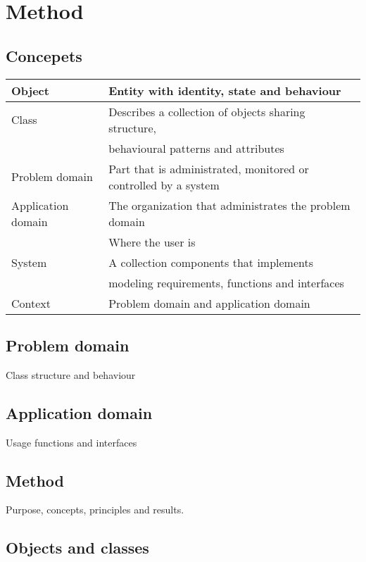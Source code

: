\chapter{Method}
\section*{Concepets}
\begin{center}
    \begin{tabular}{ l l }
        \hline
        Object & Entity with identity, state and behaviour\\\hline
        Class  & Describes a collection of objects sharing structure, \\ & behavioural patterns and attributes\\\hline
        Problem domain & Part that is administrated, monitored or controlled by a system \\\hline
        Application domain & The organization that administrates the problem domain\\ & Where the user is\\ \hline
        System & A collection components that implements \\ &  modeling requirements, functions and interfaces \\\hline        
        Context & Problem domain and application domain\\\hline
    \end{tabular}
\end{center}

\section*{Problem domain}
Class structure and behaviour

\section*{Application domain}
Usage functions and interfaces

\section*{Method}
Purpose, concepts, principles and results.

\section{Objects and classes}
